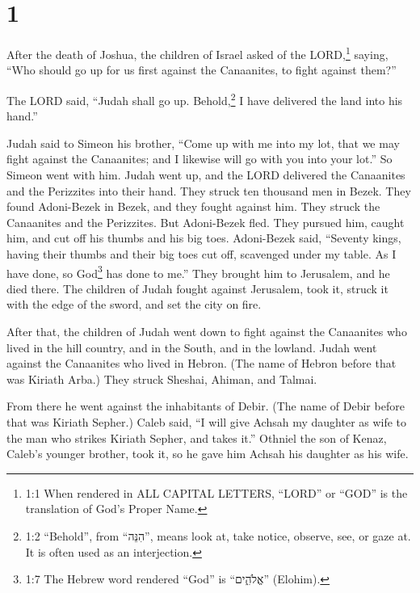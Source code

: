 \hypertarget{section}{%
\section{1}\label{section}}

 After the death of Joshua, the children of Israel asked of
the LORD,\footnote{1:1 When rendered in ALL CAPITAL LETTERS, ``LORD'' or
  ``GOD'' is the translation of God's Proper Name.} saying, ``Who should
go up for us first against the Canaanites, to fight against them?''

 The LORD said, ``Judah shall go up. Behold,\footnote{1:2
  ``Behold'', from ``הִנֵּה'', means look at, take notice, observe, see,
  or gaze at. It is often used as an interjection.} I have delivered the
land into his hand.''

 Judah said to Simeon his brother, ``Come up with me into my
lot, that we may fight against the Canaanites; and I likewise will go
with you into your lot.'' So Simeon went with him.  Judah
went up, and the LORD delivered the Canaanites and the Perizzites into
their hand. They struck ten thousand men in Bezek.  They
found Adoni-Bezek in Bezek, and they fought against him. They struck the
Canaanites and the Perizzites.  But Adoni-Bezek fled. They
pursued him, caught him, and cut off his thumbs and his big toes.
 Adoni-Bezek said, ``Seventy kings, having their thumbs and
their big toes cut off, scavenged under my table. As I have done, so
God\footnote{1:7 The Hebrew word rendered ``God'' is ``אֱלֹהִ֑ים''
  (Elohim).} has done to me.'' They brought him to Jerusalem, and he
died there.  The children of Judah fought against Jerusalem,
took it, struck it with the edge of the sword, and set the city on fire.

 After that, the children of Judah went down to fight
against the Canaanites who lived in the hill country, and in the South,
and in the lowland.  Judah went against the Canaanites who
lived in Hebron. (The name of Hebron before that was Kiriath Arba.) They
struck Sheshai, Ahiman, and Talmai.

 From there he went against the inhabitants of Debir. (The
name of Debir before that was Kiriath Sepher.)  Caleb said,
``I will give Achsah my daughter as wife to the man who strikes Kiriath
Sepher, and takes it.''  Othniel the son of Kenaz, Caleb's
younger brother, took it, so he gave him Achsah his daughter as his
wife.

